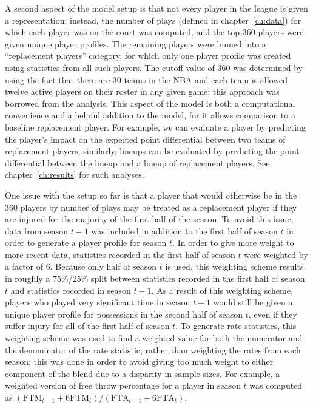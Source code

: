 A second aspect of the model setup is that not every player in the league is given a
representation; instead, the number of plays (defined in chapter~\ref{ch:data}) for
which each player was on the court was computed, and the top 360 players were given
unique player profiles. The remaining players were binned into a ``replacement
players'' category, for which only one player profile was created using statistics
from all such players. The cutoff value of 360 was determined by using the fact that
there are 30 teams in the NBA and each team is allowed twelve active players on
their roster in any given game; this approach was borrowed from the
\citeauthor{Maymin} analysis. This aspect of the model is both a computational
convenience and a helpful addition to the model, for it allows comparison to a
baseline replacement player. For example, we can evaluate a player by predicting the
player's impact on the expected point differential between two teams of replacement
players; similarly, lineups can be evaluated by predicting the point differential
between the lineup and a lineup of replacement players. See chapter~\ref{ch:results}
for such analyses.

One issue with the setup so far is that a player that would otherwise be in the 360
players by number of plays may be treated as a replacement player if they are
injured for the majority of the first half of the season. To avoid this issue, data
from season $t-1$ was included in addition to the first half of season $t$ in order
to generate a player profile for season $t$. In order to give more weight to more
recent data, statistics recorded in the first half of season $t$ were weighted by a
factor of 6. Because only half of season $t$ is used, this weighting scheme results
in roughly a 75\%/25\% split between statistics recorded in the first half of season
$t$ and statistics recorded in season $t-1$. As a result of this weighting scheme,
players who played very significant time in season $t-1$ would still be given a
unique player profile for possessions in the second half of season $t$, even if they
suffer injury for all of the first half of season $t$. To generate rate statistics,
this weighting scheme was used to find a weighted value for both the numerator and
the denominator of the rate statistic, rather than weighting the rates from each
season; this was done in order to avoid giving too much weight to either component
of the blend due to a disparity in sample sizes. For example, a weighted version of
free throw percentage for a player in season $t$ was computed as $(\text{FTM}_{t-1}
+ 6\text{FTM}_t)/(\text{FTA}_{t-1} + 6\text{FTA}_t)$.

